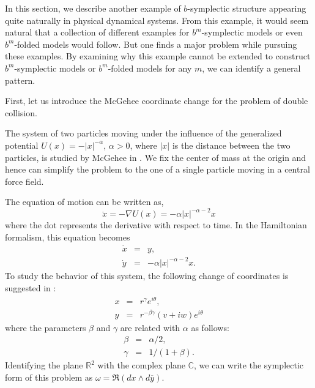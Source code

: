 In this section, we describe another example of $b$-symplectic structure appearing quite naturally in physical dynamical systems. From this example, it would seem natural that a collection of different examples for $b^m$-symplectic models or even $b^m$-folded models would follow. But one finds a major problem while pursuing these examples.  By examining why this example cannot be extended to construct $b^m$-symplectic models or $b^m$-folded models for any $m$, we can identify a general pattern.

First, let us introduce the McGehee coordinate change for the problem of double collision.

The system of two particles moving under the influence of the generalized potential $U(x) = -|x|^{-\alpha}$, $\alpha > 0$, where $|x|$ is the distance between the two particles, is studied by McGehee in \cite{McGehee}. We fix the center of mass at the origin and hence can simplify the problem to the one of a single particle moving in a central force field.


The equation of motion can be written as,
\begin{equation}
\ddot{x} = -\nabla U(x) = -\alpha |x|^{-\alpha-2}x
\end{equation}
where the dot represents the derivative with respect to time. In the Hamiltonian formalism, this equation becomes
\begin{equation}
\begin{array}{rcl}
\dot{x} & = &  y, \\
\dot{y} & = & -\alpha |x|^{-\alpha-2}x.
\end{array}
\end{equation}
To study the behavior of this system, the following change of coordinates is suggested in \cite{McGehee}:
\begin{equation}\label{eq:mcgeheechange}
\begin{array}{rcl}
x & = & r^\gamma e^{i\theta}, \\
y & = & r^{-\beta\gamma}(v + iw)e^{i\theta}
\end{array}
\end{equation}
where the parameters $\beta$ and $\gamma$ are related with $\alpha$ as follows:
\begin{equation}\label{eq:relations}
\begin{array}{rcl}
\beta & = & \alpha/2, \\
\gamma & = & 1/(1 + \beta).
\end{array}
\end{equation}
Identifying the plane $\mathbb{R}^2$ with the complex plane $\mathbb{C}$, we can write the symplectic form of this problem as $\omega = \Re (dx\wedge  d\overline{y})$.


